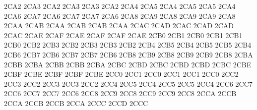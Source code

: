 \setcclcucx 2CA2 2CA3 2CA2 %
\setcclcucx 2CA3 2CA3 2CA2 %
\setcclcucx 2CA4 2CA5 2CA4 %
\setcclcucx 2CA5 2CA5 2CA4 %
\setcclcucx 2CA6 2CA7 2CA6 %
\setcclcucx 2CA7 2CA7 2CA6 %
\setcclcucx 2CA8 2CA9 2CA8 %
\setcclcucx 2CA9 2CA9 2CA8 %
\setcclcucx 2CAA 2CAB 2CAA %
\setcclcucx 2CAB 2CAB 2CAA %
\setcclcucx 2CAC 2CAD 2CAC %
\setcclcucx 2CAD 2CAD 2CAC %
\setcclcucx 2CAE 2CAF 2CAE %
\setcclcucx 2CAF 2CAF 2CAE %
\setcclcucx 2CB0 2CB1 2CB0 %
\setcclcucx 2CB1 2CB1 2CB0 %
\setcclcucx 2CB2 2CB3 2CB2 %
\setcclcucx 2CB3 2CB3 2CB2 %
\setcclcucx 2CB4 2CB5 2CB4 %
\setcclcucx 2CB5 2CB5 2CB4 %
\setcclcucx 2CB6 2CB7 2CB6 %
\setcclcucx 2CB7 2CB7 2CB6 %
\setcclcucx 2CB8 2CB9 2CB8 %
\setcclcucx 2CB9 2CB9 2CB8 %
\setcclcucx 2CBA 2CBB 2CBA %
\setcclcucx 2CBB 2CBB 2CBA %
\setcclcucx 2CBC 2CBD 2CBC %
\setcclcucx 2CBD 2CBD 2CBC %
\setcclcucx 2CBE 2CBF 2CBE %
\setcclcucx 2CBF 2CBF 2CBE %
\setcclcucx 2CC0 2CC1 2CC0 %
\setcclcucx 2CC1 2CC1 2CC0 %
\setcclcucx 2CC2 2CC3 2CC2 %
\setcclcucx 2CC3 2CC3 2CC2 %
\setcclcucx 2CC4 2CC5 2CC4 %
\setcclcucx 2CC5 2CC5 2CC4 %
\setcclcucx 2CC6 2CC7 2CC6 %
\setcclcucx 2CC7 2CC7 2CC6 %
\setcclcucx 2CC8 2CC9 2CC8 %
\setcclcucx 2CC9 2CC9 2CC8 %
\setcclcucx 2CCA 2CCB 2CCA %
\setcclcucx 2CCB 2CCB 2CCA %
\setcclcucx 2CCC 2CCD 2CCC %
